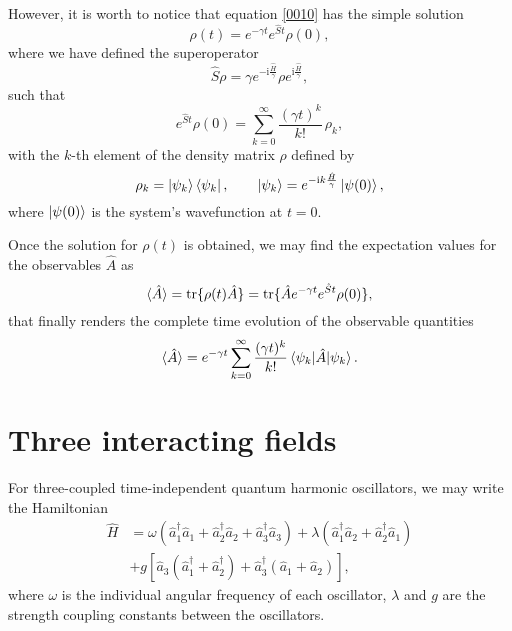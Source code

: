 \documentclass{article}
\newcommand{\mi}{\mathrm{i}}
\newcommand{\op}[1]{\hat{#1}}
\newcommand{\tr}{\mathrm{tr}}
\begin{document}
However, it is worth to notice that equation \eqref{0010} has the simple solution
\begin{equation}\label{0020}
    \rho(t)=e^{-\gamma t}e^{\op{S}t}\rho(0),
\end{equation}
where we have defined the superoperator
\begin{equation*}
    \op{S}\rho=\gamma e^{-\mi\frac{\op{H}}{\gamma}}\rho e^{\mi\frac{\op{H}}{\gamma}},
\end{equation*}
such that
\begin{equation*}
    e^{\op{S}t}\rho(0)=\sum_{k=0}^{\infty}\frac{(\gamma t)^k}{k!}\, \rho_{k},
\end{equation*}
with the $k$-th element of the density matrix $\rho$ defined by
\begin{equation}\label{expt}
    \rho_{k}=\ket{\psi_{k}}\bra{\psi_k}, \qquad \ket{\psi_{k}}=e^{-\mi k\frac{\op{H}}{\gamma}}\ket{\psi(0)},
\end{equation}
where $\ket{\psi(0)}$ is the system's wavefunction at $t = 0$.

Once the solution for $\rho(t)$ is obtained, we may find the expectation values for the observables $\op{A}$ as
\begin{equation*}
     \braket{\op{A}}  = \tr\{\rho(t)\op{A}\} = \tr\{\op{A} e^{-\gamma t}e^{\op{S}t}\rho(0)\},
\end{equation*}
that finally renders the complete time evolution of the observable quantities
\begin{equation}\label{average}
    \braket{\op{A}}  = e^{-\gamma t}\sum_{k=0}^{\infty}\frac{ (\gamma t)^k}{k!} \braket{\psi_{k} |\op{A}| \psi_{k}}.
\end{equation}

\section{Three interacting fields}\label{sec:threef}
For three-coupled time-independent quantum harmonic oscillators, we may write the Hamiltonian
\begin{equation}\label{H3}
\begin{aligned}
    \op{H} &= \omega\left(\op{a}_{1}^{\dagger}\op{a}_{1} + \op{a}_{2}^{\dagger}\op{a}_{2} + \op{a}_{3}^{\dagger}\op{a}_{3}\right) + \lambda\left(\op{a}_{1}^{\dagger}\op{a}_{2} + \op{a}_{2}^{\dagger}\op{a}_{1}\right)\\
    &+ g\left[\op{a}_{3}\left(\op{a}_{1}^{\dagger}+\op{a}_{2}^{\dagger}\right)+\op{a}_{3}^{\dagger}(\op{a}_{1}+\op{a}_{2})\right],
\end{aligned}
\end{equation}
where $\omega$ is the individual angular frequency of each oscillator, $\lambda$ and $g$ are the strength coupling constants between the oscillators. 
\end{document}
